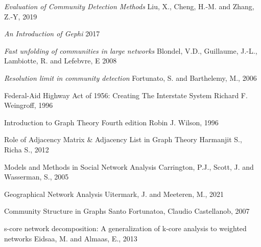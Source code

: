 \documentclass[12pt]{article}
\begin{document}
\begin{thebibliography}{100}
    \textit{Evaluation of Community Detection Methods}
    Liu, X., Cheng, H.-M. and Zhang, Z.-Y,
    2019
    
    \textit{An Introduction of Gephi}
    2017

    \textit{Fast unfolding of communities in large networks}
    Blondel, V.D., Guillaume, J.-L., Lambiotte, R. and Lefebvre, E
    2008
    
    \textit{Resolution limit in community detection}
    Fortunato, S. and Barthelemy, M.,
    2006

	{Federal-Aid Highway Act of 1956: Creating The Interstate System}
	Richard F. Weingroff,
    1996
    
   	{Introduction to Graph Theory Fourth edition }
    Robin J. Wilson,
    1996
    
    {Role of Adjacency Matrix & Adjacency List in Graph Theory}
    Harmanjit S., Richa S.,
    2012
        
    {Models and Methods in Social Network Analysis}
    Carrington, P.J., Scott, J. and Wasserman, S.,
    2005
    
    {Geographical Network Analysis}
    Uitermark, J. and Meeteren, M.,
    2021
    
    {Community Structure in Graphs}
    Santo Fortunatoa, Claudio Castellanob,
    2007
    
    {s-core network decomposition: A generalization of k-core analysis to weighted networks}
    Eidsaa, M. and Almaas, E.,
    2013
\end{thebibliography}
\end{document}
